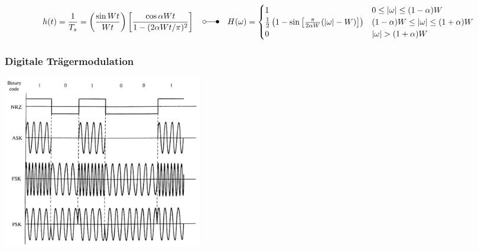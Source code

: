$$ 
h(t) = \frac{1}{T_s} = \left( \frac{\sin{W t}}{W t} \right) \left[ \frac{\cos{\alpha W t}}{1
- (2 \alpha W t / \pi)^2}\right]
\quad \laplace \quad
H(\omega) = \begin{cases}
	1 			
		&  	0 \leq | \omega | \leq (1-\alpha) W       \\
	\frac{1}{2} \left( 1 - \sin\left[ \frac{\pi}{2 \alpha W} (| \omega | - W)\right] \right)      
		&	(1-\alpha) W \leq | \omega | \leq (1+\alpha) W       \\
	0
		& 	| \omega | > (1+\alpha) W
            \end{cases}
$$


\subsubsection{Digitale Trägermodulation}
\begin{minipage}{9cm}
	\includegraphics[width=8.7cm]{bilder/dig_traegermodulation.png}
\end{minipage}
